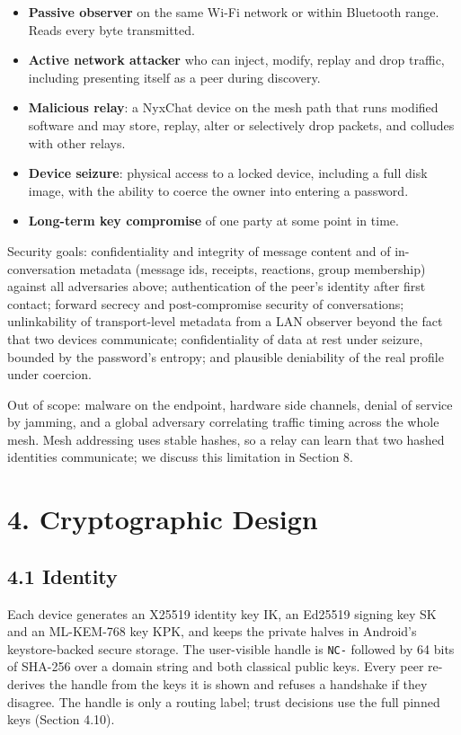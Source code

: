 \documentclass[conference]{IEEEtran}
\begin{document}
\begin{itemize}
  \item \textbf{Passive observer} on the same Wi-Fi network or within Bluetooth range. Reads every byte transmitted.
  \item \textbf{Active network attacker} who can inject, modify, replay and drop traffic, including presenting itself as a peer during discovery.
  \item \textbf{Malicious relay}: a NyxChat device on the mesh path that runs modified software and may store, replay, alter or selectively drop packets, and colludes with other relays.
  \item \textbf{Device seizure}: physical access to a locked device, including a full disk image, with the ability to coerce the owner into entering a password.
  \item \textbf{Long-term key compromise} of one party at some point in time.
\end{itemize}
Security goals: confidentiality and integrity of message content and of in-conversation metadata (message ids, receipts, reactions, group membership) against all adversaries above; authentication of the peer's identity after first contact; forward secrecy and post-compromise security of conversations; unlinkability of transport-level metadata from a LAN observer beyond the fact that two devices communicate; confidentiality of data at rest under seizure, bounded by the password's entropy; and plausible deniability of the real profile under coercion.

Out of scope: malware on the endpoint, hardware side channels, denial of service by jamming, and a global adversary correlating traffic timing across the whole mesh. Mesh addressing uses stable hashes, so a relay can learn that two hashed identities communicate; we discuss this limitation in Section 8.

\section{4. Cryptographic Design}
\subsection{4.1 Identity}
Each device generates an X25519 identity key IK, an Ed25519 signing key SK and an ML-KEM-768 key KPK, and keeps the private halves in Android's keystore-backed secure storage. The user-visible handle is \texttt{NC-} followed by 64 bits of SHA-256 over a domain string and both classical public keys. Every peer re-derives the handle from the keys it is shown and refuses a handshake if they disagree. The handle is only a routing label; trust decisions use the full pinned keys (Section 4.10).
\end{document}
